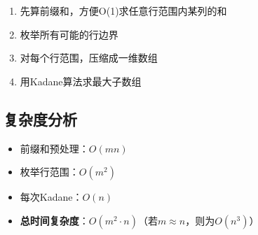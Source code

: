 \begin{enumerate}
    \item 先算前缀和，方便O(1)求任意行范围内某列的和
    \item 枚举所有可能的行边界
    \item 对每个行范围，压缩成一维数组
    \item 用Kadane算法求最大子数组
\end{enumerate}


\subsection*{复杂度分析}
\begin{itemize}
    \item 前缀和预处理：$O(mn)$
    \item 枚举行范围：$O(m^2)$
    \item 每次Kadane：$O(n)$
    \item \textbf{总时间复杂度}：$O(m^2 \cdot n)$（若$m \approx n$，则为$O(n^3)$）
\end{itemize}
